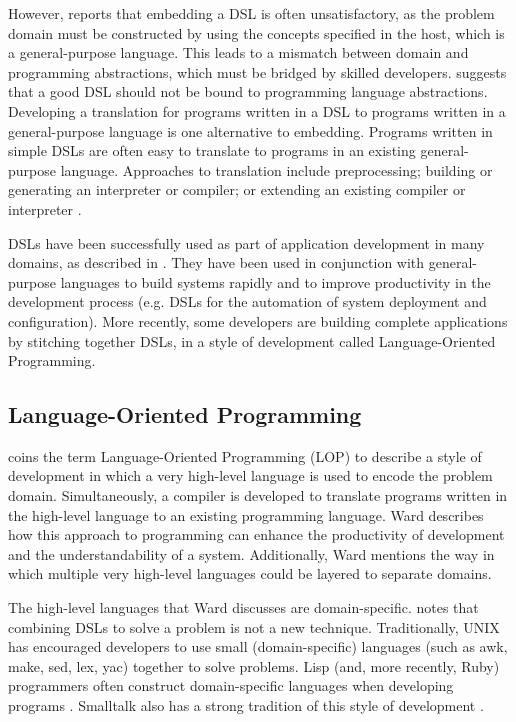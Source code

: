 However, \cite{dmitriev04lop} reports that embedding a DSL is often unsatisfactory, as the problem domain must be constructed by using the concepts specified in the host, which is a general-purpose language. This leads to a mismatch between domain and programming abstractions, which must be bridged by skilled developers. \cite{dmitriev04lop} suggests that a good DSL should not be bound to programming language abstractions. Developing a translation for programs written in a DSL to programs written in a general-purpose language is one alternative to embedding. Programs written in simple DSLs are often easy to translate to programs in an existing general-purpose language. Approaches to translation include preprocessing; building or generating an interpreter or compiler; or extending an existing compiler or interpreter \cite{dmitriev04lop}.

DSLs have been successfully used as part of application development in many domains, as described in \cite{deursen00dslbib}. They have been used in conjunction with general-purpose languages to build systems rapidly and to improve productivity in the development process (e.g. DSLs for the automation of system deployment and configuration). More recently, some developers are building complete applications by stitching together DSLs, in a style of development called Language-Oriented Programming. 

\subsection{Language-Oriented Programming}
\cite{ward94lop} coins the term Language-Oriented Programming (LOP) to describe a style of development in which a very high-level language is used to encode the problem domain. Simultaneously, a compiler is developed to translate programs written in the high-level language to an existing programming language. Ward describes how this approach to programming can enhance the productivity of development and the understandability of a system. Additionally, Ward mentions the way in which multiple very high-level languages could be layered to separate domains.

The high-level languages that Ward discusses are domain-specific. \cite{fowler05language} notes that combining DSLs to solve a problem is not a new technique. Traditionally, UNIX has encouraged developers to use small (domain-specific) languages (such as awk, make, sed, lex, yac) together to solve problems. Lisp (and, more recently, Ruby) programmers often construct domain-specific languages when developing programs \cite{graham93lisp}. Smalltalk also has a strong tradition of this style of development \cite{fowler05language}.

